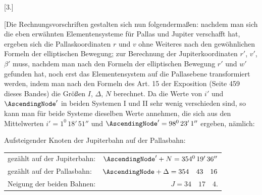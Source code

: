 \par{}\bigskip
{}
\begin{center}[3.]\end{center}
\begingroup
\newcommand{\IIIthreeSum}[2][4.25pt]{\raisebox{-#1}[0pt][0pt]{\(#2\)}}
\newcommand{\IIIthreeStroke}{\text{\kern.2em\raisebox{1.1ex}{\rule{.3em}{.2pt}}}}
\newcommand{\IIIthreeLowPoint}{\text{\kern.02em\raisebox{-.5ex}{.}}}
\newcommand{\IIIthreeMarkedComma}{\mathord{\text{\rlap{\kern.17em\raisebox{1.1ex}{.}}\rlap{\kern.26em\raisebox{-.1ex}{.}},\kern.35em}}}
\noindent\hspace*{\parindent}[Die Rechnungsvorschriften gestalten sich nun folgendermaßen: nachdem man sich die eben erwähnten Elementensysteme für Pallas und Jupiter verschafft hat, ergeben sich die Pallaskoordinaten \(r\) und \(v\) ohne Weiteres nach den gewöhnlichen Formeln der elliptischen Bewegung; zur Berechnung der Jupiterkoordinaten \(r'\), \(v'\), \(\beta'\) muss, nachdem man nach den Formeln der elliptischen Bewegung \(r'\) und \(w'\) gefunden hat, noch erst das Elementensystem auf die Pallasebene transformiert werden, indem man nach den Formeln des Art. 15 der Exposition (Seite 459 dieses Bandes) die Größen \(I\), \(\Delta\), \(N\) berechnet. Da die Werte von \(i'\) und \(\AscendingNode'\) in beiden Systemen I und II sehr wenig verschieden sind, so kann man für beide Systeme dieselben Werte annehmen, die sich aus den Mittelwerten \(i' = 1^0\,18'\,51''\) und \(\AscendingNode' = 98^0\,23'\,1''\) ergeben, nämlich:
\par
{}
Aufsteigender Knoten der Jupiterbahn auf der Pallasbahn:
\begin{center}
\begin{tabular}{@{}lr@{}}
gezählt auf der Jupiterbahn: & \(\AscendingNode'+N=354^{0}\,19'\,36''\)\\[3pt]
gezählt auf der Pallasbahn: & \(\AscendingNode+\Delta=354\quad43\quad16\)\\[3pt]
Neigung der beiden Bahnen: & \(J=34\quad17\quad4.\)
\end{tabular}
\end{center}
